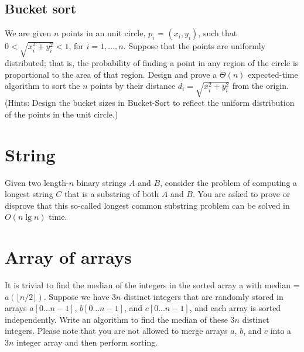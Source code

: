 \subsection{Bucket sort}
\begin{Exercise}
We are given $n$ points in an unit circle, $ p_i$ = $(x_i, y_i)$, such that $0 < \sqrt{x_i^2 + y_i^2} < 1$, for $i = 1, \dots, n$. Suppose that the points are uniformly distributed; that is, the probability of finding a point in any region of the circle is proportional to the area of that region. Design and prove a $\Theta(n)$ expected-time algorithm to sort the $n$ points by their distance $d_i = \sqrt{x_i^2 + y_i^2}$ from the origin. (Hints: Design the bucket sizes in Bucket-Sort to reflect the uniform distribution of the points in the unit circle.) 
\end{Exercise}
\begin{Answer}
\end{Answer}

\section{String}
\begin{Exercise}
Given two length-$n$ binary strings $A$ and $B$, consider the problem of computing a longest string $C$ that is a substring of both $A$ and $B$. You are asked to prove or disprove that this so-called longest common substring problem can be solved in $O(n \lg n)$ time. 
\end{Exercise}
\begin{Answer}
\end{Answer}

\section{Array of arrays}

\begin{Exercise}
It is trivial to find the median of the integers in the sorted array a with median = $a(\lfloor n/2 \rfloor)$. Suppose we have $3n$ distinct integers that are randomly stored in arrays $a[0 \dots n-1]$, $b[0 \dots n-1]$, and $c[0 \dots n-1]$, and each array is sorted independently. Write an algorithm to find the median of these $3n$ distinct integers. Please note that you are not allowed to merge arrays $a$, $b$, and $c$ into a $3n$ integer array and then perform sorting. 
\end{Exercise}
\begin{Answer}
\end{Answer}


